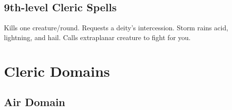 \subsection{9th-level Cleric Spells}
\begin{spelllist}
   Kills one creature/round.
  \M Requests a deity's intercession.
   Storm rains acid, lightning, and hail.
   Calls extraplanar creature to fight for you.
\end{spelllist}

\section{Cleric Domains}  

\begin{comment}
\subsection{Example Domain}
\parhead{Domain Power}
\parhead{Channelled Domain Power}
\parhead{Greater Domain Power}
\parhead{Greater Channelled Domain Power}
\parhead{Domain Mastery}
\begin{spelllist}
  \spellhead[1]{}
  \spellhead[1]{}
  \spellhead[2]{}
  \spellhead[2]{}
  \spellhead[3]{}
  \spellhead[3]{}
  \spellhead[4]{}
  \spellhead[4]{}
  \spellhead[5]{}
  \spellhead[5]{}
  \spellhead[6]{}
  \spellhead[6]{}
  \spellhead[7]{}
  \spellhead[7]{}
  \spellhead[8]{}
  \spellhead[8]{}
  \spellhead[9]{}
  \spellhead[9]{}
\end{spelllist}
\end{comment}

\subsection{Air Domain}

